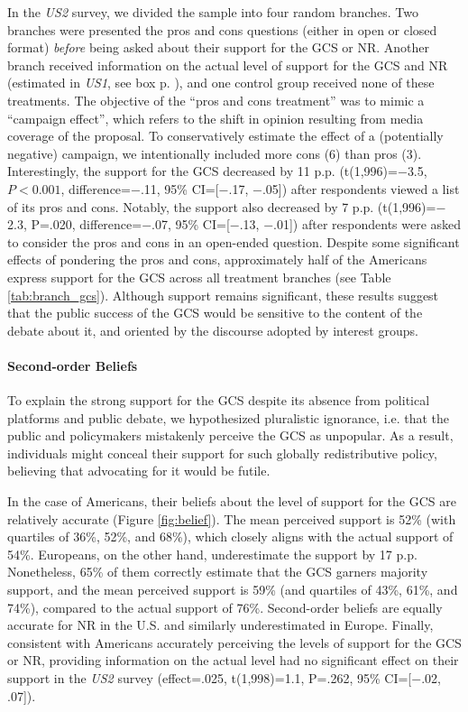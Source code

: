 \documentclass[12pt,english]{article}
\begin{document}
In the \textit{US2} survey, we divided the sample into four random branches. Two branches were presented the pros and cons questions (either in open or closed format) \textit{before} being asked about their support for the GCS or NR. Another branch received information on the actual level of support for the GCS and NR (estimated in \textit{US1}, see box p. \pageref{subsec:second_order_beliefs}), %
and one control group received none of these treatments. %
The objective of the ``pros and cons treatment'' was to mimic a ``campaign effect'', which refers to the shift in opinion resulting from media coverage of the proposal.\citep{gustafson_development_2019,anderson_can_2023} To conservatively estimate the effect of a (potentially negative) campaign, we intentionally included more cons (6) than pros (3). Interestingly, the support for the GCS decreased by 11 p.p. (t(1,996)=$-$3.5, $P<0.001$, difference=$-$.11, 95\% CI=[$-$.17, $-$.05]) after respondents viewed a list of its pros and cons. %
Notably, the support also decreased by 7 p.p. (t(1,996)=$-$2.3, P=.020, difference=$-$.07, 95\% CI=[$-$.13, $-$.01]) after respondents were asked to consider the pros and cons in an open-ended question. Despite some significant effects of pondering the pros and cons, approximately half of the Americans express support for the GCS across all treatment branches (see Table \ref{tab:branch_gcs}). Although support remains significant, %
these results suggest that the public success of the GCS would be sensitive to the content of the debate about it, and oriented by the discourse adopted by interest groups. %
\begin{tcolorbox}\label{subsec:second_order_beliefs}
  \paragraph{Second-order Beliefs}
To explain the strong support for the GCS despite its absence from political platforms and public debate, we hypothesized pluralistic ignorance, i.e. that the public and policymakers mistakenly perceive the GCS as unpopular. As a result, individuals might conceal their support for such globally redistributive policy, believing that advocating for it would be futile. 

In the case of Americans, their beliefs about the level of support for the GCS are relatively accurate (Figure \ref{fig:belief}). The mean perceived support is 52\% (with quartiles of 36\%, 52\%, and 68\%), which closely aligns with the actual support of 54\%. Europeans, on the other hand, underestimate the support by 17 p.p. Nonetheless, 65\% of them correctly estimate that the GCS garners majority support, and the mean perceived support is 59\% (and quartiles of 43\%, 61\%, and 74\%), compared to the actual support of 76\%. %
Second-order beliefs are equally accurate for NR in the U.S. and similarly underestimated in Europe. %
Finally, consistent with Americans accurately perceiving the levels of support for the GCS or NR, providing information on the actual level had no significant effect on their support in the \textit{US2} survey (effect=.025, t(1,998)=1.1, P=.262, 95\% CI=[$-$.02, .07]). %
\end{tcolorbox}
\end{document}
